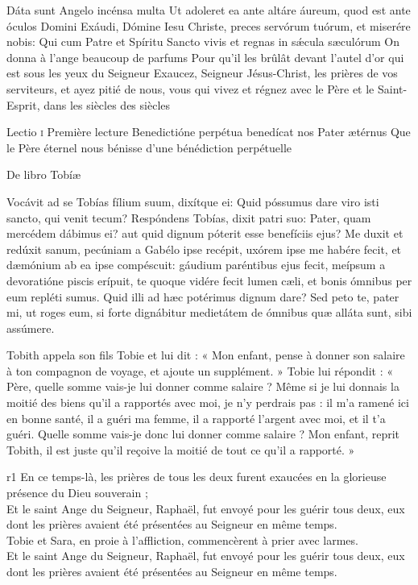 \documentclass[twoside]{article}
\begin{document}
\begin{paracol}[1]{2}
\switchcolumn*

\versiculusabsolutio
	{Dáta sunt Angelo incénsa multa}
	{Ut adoleret ea ante altáre áureum, quod est ante óculos Domini}
	{Exáudi, Dómine Iesu Christe, preces servórum tuórum, et miserére nobis: Qui cum Patre et Spíritu Sancto vivis et regnas in sǽcula sæculórum}
	{On donna à l’ange beaucoup de parfums}
	{Pour qu’il les brûlât devant l’autel d’or qui est sous les yeux du Seigneur}
	{Exaucez, Seigneur Jésus-Christ, les prières de vos serviteurs, et ayez pitié de nous, vous qui vivez et régnez avec le Père et le Saint-Esprit, dans les siècles des siècles}

\lectioresponsorium
	{Lectio \textsc{i}}
	{Première lecture}
	{Benedictióne perpétua benedícat nos Pater ætérnus}
	{Que le Père éternel nous bénisse d'une bénédiction perpétuelle}
	{
		De libro Tobíæ

		Vocávit ad se Tobías fílium suum, dixítque ei: Quid póssumus dare viro isti sancto, qui venit tecum?
		Respóndens Tobías, dixit patri suo: Pater, quam mercédem dábimus ei? aut quid dignum póterit esse benefíciis ejus?
		Me duxit et redúxit sanum, pecúniam a Gabélo ipse recépit, uxórem ipse me habére fecit, 
		et dæmónium ab ea ipse compéscuit: gáudium paréntibus ejus fecit, meípsum a devoratióne piscis erípuit, 
		te quoque vidére fecit lumen cæli, et bonis ómnibus per eum repléti sumus. Quid illi ad hæc potérimus dignum dare?
		Sed peto te, pater mi, ut roges eum, si forte dignábitur medietátem de ómnibus quæ alláta sunt, sibi assúmere.
	}
	{	
		
		Tobith appela son fils Tobie et lui dit : « Mon enfant, pense à donner son salaire à ton compagnon de voyage, et ajoute un supplément. »
		Tobie lui répondit : « Père, quelle somme vais-je lui donner comme salaire ? Même si je lui donnais la moitié des biens qu’il a rapportés avec moi, je n’y perdrais pas :
		il m’a ramené ici en bonne santé, il a guéri ma femme, il a rapporté l’argent avec moi, et il t’a guéri. Quelle somme vais-je donc lui donner comme salaire ?
		Mon enfant, reprit Tobith, il est juste qu’il reçoive la moitié de tout ce qu’il a rapporté. »
	}
	{r1}
	{\pagebreak
	\rr En ce temps-là, les prières de tous les deux furent exaucées en la glorieuse présence du Dieu souverain ; \\
	\GreSpecial{*} Et le saint Ange du Seigneur, Raphaël, fut envoyé pour les guérir tous deux, eux dont les prières avaient été présentées au Seigneur en même temps. \\
	\vv Tobie et Sara, en proie à l’affliction, commencèrent à prier avec larmes.\\
	\GreSpecial{*} Et le saint Ange du Seigneur, Raphaël, fut envoyé pour les guérir tous deux, eux dont les prières avaient été présentées au Seigneur en même temps.}


\end{paracol}
\end{document}
